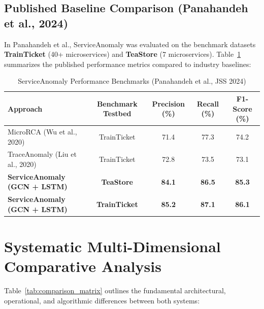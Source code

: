 \documentclass[11pt,a4paper]{article}
\begin{document}
\subsection{Published Baseline Comparison (Panahandeh et al., 2024)}
In Panahandeh et al., ServiceAnomaly was evaluated on the benchmark datasets \textbf{TrainTicket} (40+ microservices) and \textbf{TeaStore} (7 microservices). Table~\ref{tab:serviceanomaly_benchmark} summarizes the published performance metrics compared to industry baselines:

\begin{table}[htbp]
\centering
\caption{ServiceAnomaly Performance Benchmarks (Panahandeh et al., JSS 2024)}
\label{tab:serviceanomaly_benchmark}
\small
\begin{tabular}{lcccc}
\toprule
\textbf{Approach} & \textbf{Benchmark Testbed} & \textbf{Precision (\%)} & \textbf{Recall (\%)} & \textbf{F1-Score (\%)} \\
\midrule
MicroRCA (Wu et al., 2020) & TrainTicket & 71.4 & 77.3 & 74.2 \\
TraceAnomaly (Liu et al., 2020) & TrainTicket & 72.8 & 73.5 & 73.1 \\
\textbf{ServiceAnomaly (GCN + LSTM)} & \textbf{TeaStore} & \textbf{84.1} & \textbf{86.5} & \textbf{85.3} \\
\textbf{ServiceAnomaly (GCN + LSTM)} & \textbf{TrainTicket} & \textbf{85.2} & \textbf{87.1} & \textbf{86.1} \\
\bottomrule
\end{tabular}
\end{table}

\section{Systematic Multi-Dimensional Comparative Analysis}

Table~\ref{tab:comparison_matrix} outlines the fundamental architectural, operational, and algorithmic differences between both systems:
\end{document}
